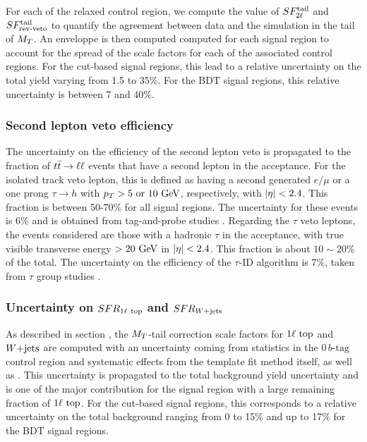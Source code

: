             For each of the relaxed control region, we compute the value of $SF_{2\ell}^{\text{tail}}$
            and $SF_{\text{rev-veto}}^{\text{tail}}$ to quantify the agreement between data and the simulation in
            the tail of $M_T$. An enveloppe is then computed computed for each signal
            region to account for the spread of the scale factors for each of the
            associated control regions. For the cut-based signal regions, this lead to a
            relative uncertainty on the total yield varying from 1.5 to 35\%. For the
            BDT signal regions, this relative uncertainty is between 7 and 40\%.

            \subsubsection{Second lepton veto efficiency}

            The uncertainty on the efficiency of the second lepton veto is propagated to the
            fraction of $t\bar{t} \rightarrow \ell \ell$ events that have a second lepton in the acceptance. For
            the isolated track veto lepton, this is defined as having a second generated
            $e/\mu$ or a one prong $\tau \rightarrow h$ with $p_T > 5 \text{ or } 10 ~\text{GeV}$,
            respectively, with $\left| \eta \right| < 2.4$. This fraction is between 50-70\% for all
            signal regions. The uncertainty for these events is 6\% and is obtained from
            tag-and-probe studies . Regarding the $\tau$ veto leptons, the
            events considered are those with a hadronic $\tau$ in the acceptance, with
            true visible transverse energy $> 20~\text{GeV}$ in $\left| \eta \right| < 2.4$. This fraction is
            about $10 \sim 20 \%$ of the total. The uncertainty on the efficiency of the
            $\tau$-ID algorithm is 7\%, taken from $\tau$ group studies .

            \subsubsection{Uncertainty on $SFR_{1\ell~\text{top}}$ and $SFR_{\text{$W$+jets}}$}

            As described in section \label{sec:MTtailCorrection}, the $M_T$-tail correction
            scale factors for $1\ell~\text{top}$ and $\text{$W$+jets}$ are computed with an uncertainty
            coming from statistics in the $0\, b\text{-tag}$ control region and systematic effects
            from the template fit method itself, as well as . This uncertainty is propagated
            to the total background yield uncertainty and is one of the major contribution
            for the signal region with a large remaining fraction of $1\ell~\text{top}$.
            For the cut-based signal regions, this corresponds to a relative uncertainty
            on the total background ranging from 0 to 15\% and up to 17\% for the BDT
            signal regions.

